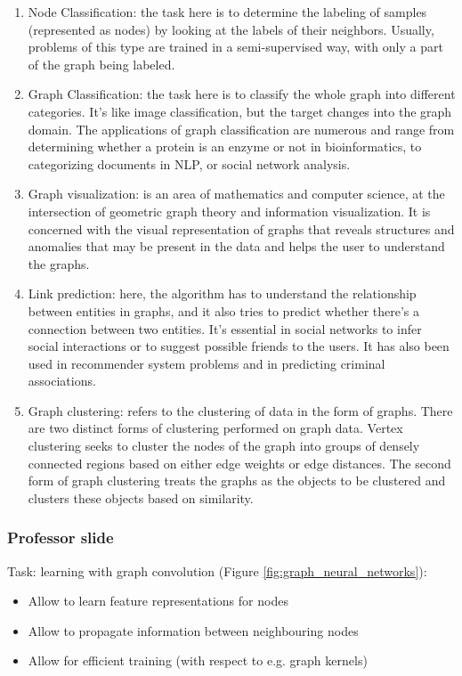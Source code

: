 \begin{enumerate}
	\item Node Classification: the task here is to determine the labeling of
		samples (represented as nodes) by looking at the labels of their neighbors. Usually,
		problems of this type are trained in a semi-supervised way, with only a part
		of the graph being labeled.

	\item Graph Classification: the task here is to classify the whole graph into
		different categories. It’s like image classification, but the target changes
		into the graph domain. The applications of graph classification are numerous
		and range from determining whether a protein is an enzyme or not in bioinformatics,
		to categorizing documents in NLP, or social network analysis.

	\item Graph visualization: is an area of mathematics and computer science, at the
		intersection of geometric graph theory and information visualization. It is
		concerned with the visual representation of graphs that reveals structures
		and anomalies that may be present in the data and helps the user to
		understand the graphs.

	\item Link prediction: here, the algorithm has to understand the relationship between
		entities in graphs, and it also tries to predict whether there’s a
		connection between two entities. It’s essential in social networks to infer social
		interactions or to suggest possible friends to the users. It has also been
		used in recommender system problems and in predicting criminal associations.

	\item Graph clustering: refers to the clustering of data in the form of graphs.
		There are two distinct forms of clustering performed on graph data. Vertex
		clustering seeks to cluster the nodes of the graph into groups of densely
		connected regions based on either edge weights or edge distances. The second
		form of graph clustering treats the graphs as the objects to be clustered and
		clusters these objects based on similarity.
\end{enumerate}

\subsubsection{Professor slide}
Task: learning with graph convolution (Figure \ref{fig:graph_neural_networks}):
\begin{itemize}
	\item Allow to learn feature representations for nodes

	\item Allow to propagate information between neighbouring nodes

	\item Allow for efficient training (with respect to e.g. graph kernels)
\end{itemize}